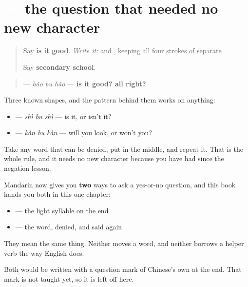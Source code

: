 \section[\texorpdfstring{\zh{好不好} (hǎo bu hǎo)}{好不好 (hǎo bu hǎo)}]{ — the question that needed no new character}

\label{lesson:ZH-C19-haobuhao}



\begin{quote}
Say \textbf{is it good}. \emph{Write it:}  and , keeping all four strokes of  separate

Say \textbf{secondary school}.
\end{quote}

\begin{grammarlens}[title={Grammar lens — say it, deny it, say it again}]
\begin{quote}
\textbf{} — \emph{hǎo bu hǎo} — \textbf{is it good? all right?}
\end{quote}

Three known shapes, and the pattern behind them works on anything:

\begin{itemize}
\raggedright
  \item \textbf{} — \emph{shì bu shì} — is it, or isn't it?
  \item \textbf{} — \emph{kàn bu kàn} — will you look, or won't you?
\end{itemize}

Take any word that can be denied, put \textbf{} in the middle, and repeat it. That is the whole rule, and it needs no new character because you have had  since the negation lesson.

Mandarin now gives you \textbf{two} ways to ask a yes-or-no question, and this book hands you both in this one chapter:

\begin{itemize}
\raggedright
  \item \textbf{} — the light syllable on the end
  \item \textbf{} — the word, denied, and said again
\end{itemize}

They mean the same thing. Neither moves a word, and neither borrows a helper verb the way English does.

Both would be written with a question mark of Chinese's own at the end. That mark is not taught yet, so it is left off here.
\end{grammarlens}

